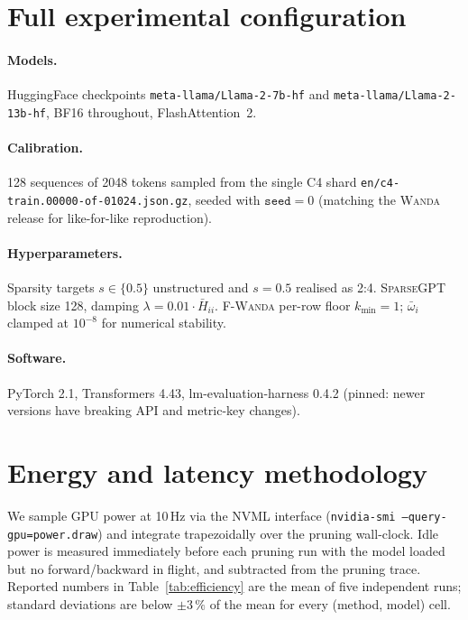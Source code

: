 \documentclass[11pt]{article}
\newcommand{\fwanda}{\textsc{F-Wanda}}
\newcommand{\wanda}{\textsc{Wanda}}
\newcommand{\sgpt}{\textsc{SparseGPT}}
\begin{document}



\clearpage
\appendix

\section{Full experimental configuration}
\label{app:config}

\paragraph{Models.} HuggingFace checkpoints \texttt{meta-llama/Llama-2-7b-hf}
and \texttt{meta-llama/Llama-2-13b-hf}, BF16 throughout, FlashAttention~2.

\paragraph{Calibration.} 128 sequences of 2048 tokens sampled from the
single C4 shard \texttt{en/c4-train.00000-of-01024.json.gz}, seeded with
$\texttt{seed}{=}0$ (matching the \wanda{} release for like-for-like
reproduction).

\paragraph{Hyperparameters.} Sparsity targets $s \in \{0.5\}$ unstructured
and $s = 0.5$ realised as 2{:}4. \sgpt{} block size 128, damping
$\lambda=0.01\cdot\bar{H}_{ii}$. \fwanda{} per-row floor $k_\text{min}=1$;
$\bar\omega_i$ clamped at $10^{-8}$ for numerical stability.

\paragraph{Software.} PyTorch 2.1, Transformers 4.43,
lm-evaluation-harness 0.4.2 (pinned: newer versions have breaking API
and metric-key changes).

\section{Energy and latency methodology}
\label{app:energy}

We sample GPU power at 10\,Hz via the NVML interface
(\texttt{nvidia-smi --query-gpu=power.draw}) and integrate trapezoidally
over the pruning wall-clock. Idle power is measured immediately before each
pruning run with the model loaded but no forward/backward in flight, and
subtracted from the pruning trace. Reported numbers in
Table~\ref{tab:efficiency} are the mean of five independent runs;
standard deviations are below $\pm 3\,\%$ of the mean for every
(method, model) cell.
\end{document}
